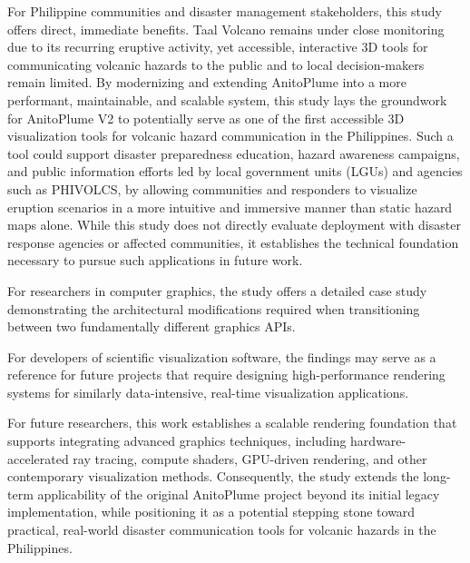 For Philippine communities and disaster management stakeholders, this study offers direct, immediate benefits. Taal Volcano remains under close monitoring due to its recurring eruptive activity, yet accessible, interactive 3D tools for communicating volcanic hazards to the public and to local decision-makers remain limited. By modernizing and extending AnitoPlume into a more performant, maintainable, and scalable system, this study lays the groundwork for AnitoPlume V2 to potentially serve as one of the first accessible 3D visualization tools for volcanic hazard communication in the Philippines. Such a tool could support disaster preparedness education, hazard awareness campaigns, and public information efforts led by local government units (LGUs) and agencies such as PHIVOLCS, by allowing communities and responders to visualize eruption scenarios in a more intuitive and immersive manner than static hazard maps alone. While this study does not directly evaluate deployment with disaster response agencies or affected communities, it establishes the technical foundation necessary to pursue such applications in future work.

For researchers in computer graphics, the study offers a detailed case study demonstrating the architectural modifications required when transitioning between two fundamentally different graphics APIs.

For developers of scientific visualization software, the findings may serve as a reference for future projects that require designing high-performance rendering systems for similarly data-intensive, real-time visualization applications.

For future researchers, this work establishes a scalable rendering foundation that supports integrating advanced graphics techniques, including hardware-accelerated ray tracing, compute shaders, GPU-driven rendering, and other contemporary visualization methods. Consequently, the study extends the long-term applicability of the original AnitoPlume project beyond its initial legacy implementation, while positioning it as a potential stepping stone toward practical, real-world disaster communication tools for volcanic hazards in the Philippines.